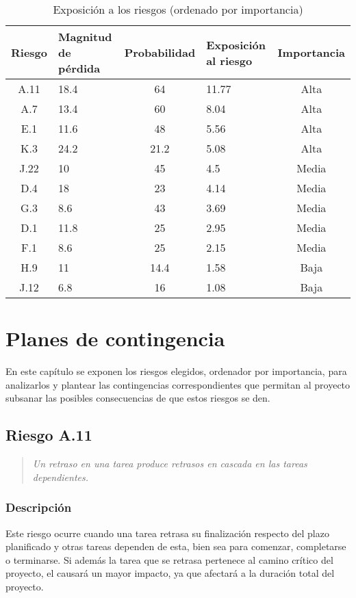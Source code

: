 \documentclass[11pt,a4paper,spanish,twoside]{book}
\begin{document}
\begin{table}[!h]
  \centering
  \begin{tabular}{|c|b{2.1cm}<{\centering}|c|b{2cm}<{\centering}|c|}
    \hline
    \textbf{Riesgo} & \textbf{Magnitud de pérdida} & \textbf{Probabilidad} & 
    \textbf{Exposición al riesgo} & \textbf{Importancia} \\
    \hline \hline
    A.11 & 18.4 & 64   & 11.77 & Alta  \\ \hline
    A.7  & 13.4 & 60   & 8.04  & Alta  \\ \hline 
    E.1  & 11.6 & 48   & 5.56  & Alta  \\ \hline
    K.3  & 24.2 & 21.2 & 5.08  & Alta  \\ \hline
    J.22 & 10   & 45   & 4.5   & Media \\ \hline
    D.4  & 18   & 23   & 4.14  & Media \\ \hline
    G.3  & 8.6  & 43   & 3.69  & Media \\ \hline
    D.1  & 11.8 & 25   & 2.95  & Media \\ \hline
    F.1  & 8.6  & 25   & 2.15  & Media \\ \hline
    H.9  & 11   & 14.4 & 1.58  & Baja  \\ \hline
    J.12 & 6.8  & 16   & 1.08  & Baja  \\ \hline
  \end{tabular}
  \caption{Exposición a los riesgos (ordenado por importancia)} 
  \label{Tab:Expor}
\end{table}

\chapter{Planes de contingencia}
En este capítulo se exponen los riesgos elegidos, ordenador por importancia,
para analizarlos y plantear las contingencias correspondientes que permitan
al proyecto subsanar las posibles consecuencias de que estos riesgos se den.

\section{Riesgo A.11}
\begin{quote}
  \emph{Un retraso en una tarea produce retrasos en cascada en las tareas
    dependientes.} 
\end{quote}

\subsection{Descripción}
Este riesgo ocurre cuando una tarea retrasa su finalización respecto del plazo
planificado y otras tareas dependen de esta, bien sea para comenzar, 
completarse o terminarse. Si además la tarea que se retrasa pertenece al camino
crítico del proyecto, el causará un mayor impacto, ya que afectará
a la duración total del proyecto.
\end{document}
